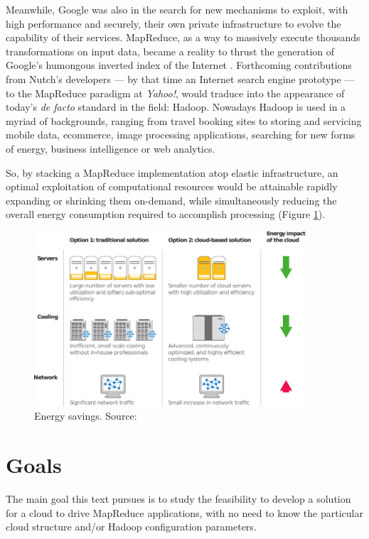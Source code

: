 Meanwhile, Google was also in the search for new mechanisms to exploit, with high performance and securely, their own private infrastructure to evolve the capability of their services. MapReduce, as a way to massively execute thousands transformations on input data, became a reality to thrust the generation of Google's humongous inverted index of the Internet \cite{googlemapreduce}. Forthcoming contributions from Nutch's developers --- by that time an Internet search engine prototype --- to the MapReduce paradigm at \emph{Yahoo!}, would traduce into the appearance of today's \emph{de facto} standard in the field: Hadoop. Nowadays Hadoop is used in a myriad of backgrounds, ranging from travel booking sites to storing and servicing mobile data, ecommerce, image processing applications, searching for new forms of energy, business intelligence or web analytics.

So, by stacking a MapReduce implementation atop elastic infrastructure, an optimal exploitation of computational resources would be attainable rapidly expanding or shrinking them on-demand, while simultaneously reducing the overall energy consumption required to accomplish processing (Figure \ref{fig:energysavings}).

\begin{figure}[tbp]
\begin{center}
\includegraphics[width=0.9\textwidth]{imagenes/002.pdf}
 \caption{Energy savings. Source: \cite{googleapps}}
\label{fig:energysavings}
\end{center}
\end{figure}

\section{Goals}\label{sec:objetivos}
\noindent The main goal this text pursues is to study the feasibility to develop a solution for a cloud to drive MapReduce applications, with no need to know the particular cloud structure and/or Hadoop configuration parameters.

